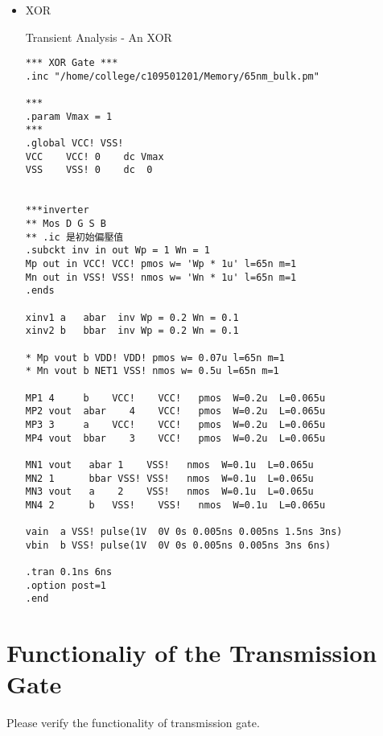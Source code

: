 \documentclass[a4paper]{article}
\newenvironment{code}{\captionsetup{type=listing, font=large, name=List.}}{}
\begin{document}
\begin{itemize}
            \item XOR
\begin{code}
    \caption{Transient Analysis - An XOR}
        \label{inv}
    \begin{verbatim}
*** XOR Gate ***
.inc "/home/college/c109501201/Memory/65nm_bulk.pm"

*** 
.param Vmax = 1
***
.global VCC! VSS! 
VCC    VCC! 0    dc Vmax
VSS    VSS! 0    dc  0


***inverter
** Mos D G S B
** .ic 是初始偏壓值
.subckt inv in out Wp = 1 Wn = 1
Mp out in VCC! VCC! pmos w= 'Wp * 1u' l=65n m=1
Mn out in VSS! VSS! nmos w= 'Wn * 1u' l=65n m=1
.ends

xinv1 a   abar  inv Wp = 0.2 Wn = 0.1
xinv2 b   bbar  inv Wp = 0.2 Wn = 0.1

* Mp vout b VDD! VDD! pmos w= 0.07u l=65n m=1
* Mn vout b NET1 VSS! nmos w= 0.5u l=65n m=1

MP1 4     b    VCC!    VCC!   pmos  W=0.2u  L=0.065u
MP2 vout  abar    4    VCC!   pmos  W=0.2u  L=0.065u
MP3 3     a    VCC!    VCC!   pmos  W=0.2u  L=0.065u
MP4 vout  bbar    3    VCC!   pmos  W=0.2u  L=0.065u

MN1 vout   abar 1    VSS!   nmos  W=0.1u  L=0.065u
MN2 1      bbar VSS! VSS!   nmos  W=0.1u  L=0.065u
MN3 vout   a    2    VSS!   nmos  W=0.1u  L=0.065u
MN4 2      b   VSS!    VSS!   nmos  W=0.1u  L=0.065u

vain  a VSS! pulse(1V  0V 0s 0.005ns 0.005ns 1.5ns 3ns)
vbin  b VSS! pulse(1V  0V 0s 0.005ns 0.005ns 3ns 6ns)

.tran 0.1ns 6ns
.option post=1
.end  
\end{verbatim}
    \end{code}
        \end{itemize}


\clearpage
    \section {\bf Functionaliy of the Transmission Gate}

Please verify the functionality of transmission gate.
\end{document}
